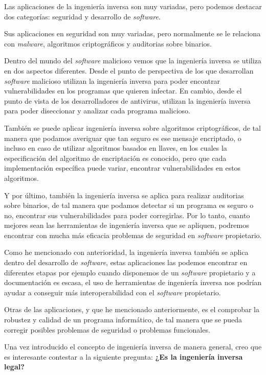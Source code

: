 Las aplicaciones de la ingeniería inversa son muy variadas, pero podemos destacar dos categorías: seguridad y desarrollo de \textit{software}.

Sus aplicaciones en seguridad son muy variadas, pero normalmente se le relaciona con \textit{malware}, algoritmos criptográficos y auditorias sobre binarios.

Dentro del mundo del \textit{software} malicioso vemos que la ingeniería inversa se utiliza en dos aspectos diferentes. Desde el punto de perspectiva de los que desarrollan
\textit{software} malicioso utilizan la ingeniería inversa para poder encontrar vulnerabilidades en los programas que quieren infectar. En cambio, desde el punto de vista de los
desarrolladores de antivirus, utilizan la ingeniería inversa para poder diseccionar y analizar cada programa malicioso.

También se puede aplicar ingeniería inversa sobre algoritmos criptográficos, de tal manera que podamos averiguar que tan seguro es ese mensaje encriptado, o incluso en caso de utilizar
algoritmos basados en llaves, en los cuales la especificación del algoritmo de encriptación es conocido, pero que cada implementación específica puede variar, encontrar vulnerabilidades
en estos algoritmos.

Y por último, también la ingeniería inversa se aplica para realizar auditorias sobre binarios, de tal manera que podamos detectar si un programa es seguro o no, encontrar sus vulnerabilidades
para poder corregirlas. Por lo tanto, cuanto mejores sean las herramientas de ingeniería inversa que se apliquen, podremos encontrar con mucha más eficacia problemas de seguridad en
\textit{software} propietario.

Como he mencionado con anterioridad, la ingeniería inversa también se aplica dentro del desarrollo de \textit{software}, estas aplicaciones las podemos encontrar en diferentes etapas
por ejemplo cuando disponemos de un \textit{software} propietario y a documentación es escasa, el uso de herramientas de ingeniería inversa nos podrían ayudar a conseguir más interoperabilidad
con el \textit{software} propietario.

Otras de las aplicaciones, y que he mencionado anteriormente, es el comprobar la robustez y calidad de un programa informático, de tal manera que se pueda corregir posibles problemas
de seguridad o problemas funcionales.

Una vez introducido el concepto de ingeniería inversa de manera general, creo que es interesante contestar a la siguiente pregunta: \textbf{¿Es la ingeniería inversa legal?}

